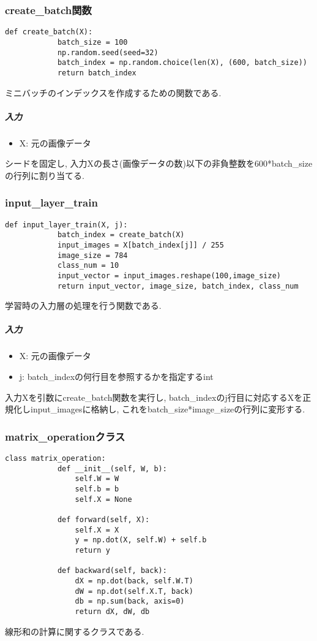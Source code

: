 \documentclass[a4j, titlepage]{jarticle}
\begin{document}
    \subsubsection{create\_batch関数}
        \begin{lstlisting}[caption=ミニバッチを作成,label=fuga]
        def create_batch(X):
            batch_size = 100
            np.random.seed(seed=32)
            batch_index = np.random.choice(len(X), (600, batch_size))
            return batch_index
        \end{lstlisting}
        ミニバッチのインデックスを作成するための関数である.
            \subparagraph*{入力}
            \begin{itemize}
                \item X: 元の画像データ
            \end{itemize}
            シードを固定し, 入力Xの長さ(画像データの数)以下の非負整数を600*batch\_sizeの行列に割り当てる.

    \subsubsection{input\_layer\_train}
        \begin{lstlisting}[caption=学習時の入力層の処理,label=fuga]
        def input_layer_train(X, j):
            batch_index = create_batch(X)
            input_images = X[batch_index[j]] / 255
            image_size = 784
            class_num = 10
            input_vector = input_images.reshape(100,image_size)
            return input_vector, image_size, batch_index, class_num
        \end{lstlisting}
        学習時の入力層の処理を行う関数である.
            \subparagraph*{入力}
            \begin{itemize}
                \item X: 元の画像データ
                \item j: batch\_indexの何行目を参照するかを指定するint
            \end{itemize}
            入力Xを引数にcreate\_batch関数を実行し, batch\_indexのj行目に対応するXを正規化しinput\_imagesに格納し, これをbatch\_size*image\_sizeの行列に変形する.

    \subsubsection{matrix\_operationクラス}
        \begin{lstlisting}[caption=線形和の計算 ,label=fuga]
        class matrix_operation:
            def __init__(self, W, b):
                self.W = W
                self.b = b
                self.X = None

            def forward(self, X):
                self.X = X
                y = np.dot(X, self.W) + self.b
                return y

            def backward(self, back):
                dX = np.dot(back, self.W.T)
                dW = np.dot(self.X.T, back)
                db = np.sum(back, axis=0)
                return dX, dW, db
        \end{lstlisting}
        線形和の計算に関するクラスである.
\end{document}
